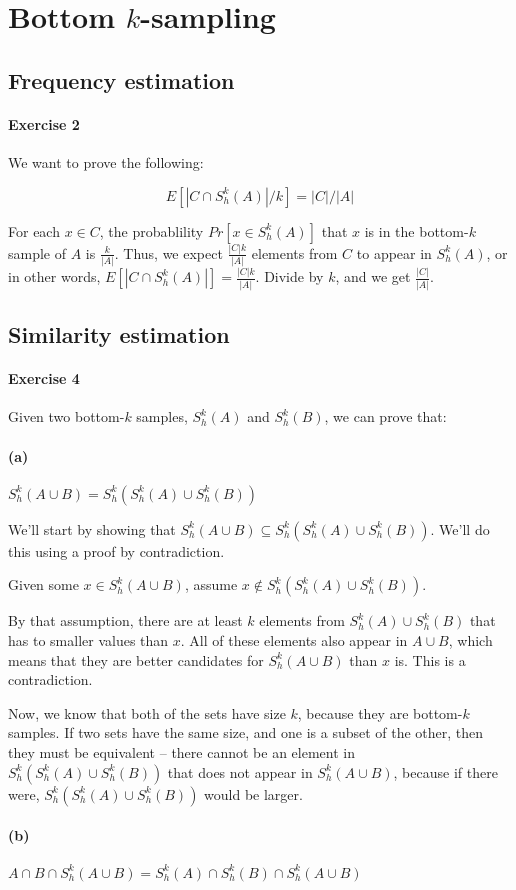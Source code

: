 \section{Bottom $k$-sampling}

\subsection{Frequency estimation}

\paragraph{Exercise 2}
We want to prove the following:

\[
    E[|C \cap S^k_h(A)|/k] = |C|/|A|
\]

For each $x \in C$, the probablility $Pr[x \in S^k_h(A)]$ that $x$ is in the bottom-$k$ sample of $A$ is $\frac{k}{|A|}$. Thus, we expect $\frac{|C|k}{|A|}$ elements from $C$ to appear in $S^k_h(A)$, or in other words, $E[|C \cap S^k_h(A)|] = \frac{|C|k}{|A|}$. Divide by $k$, and we get $\frac{|C|}{|A|}$. 

\subsection{Similarity estimation}

\paragraph{Exercise 4}
Given two bottom-$k$ samples, $S^k_h(A)$ and $S^k_h(B)$, we can prove that:

\paragraph*{(a)}
$S^k_h(A \cup B) = S^k_h(S^k_h(A) \cup S^k_h(B))$

We'll start by showing that $S^k_h(A \cup B) \subseteq S^k_h(S^k_h(A) \cup S^k_h(B))$. We'll do this using a proof by contradiction.

Given some $x \in S^k_h(A \cup B)$, assume $x \notin S^k_h(S^k_h(A) \cup S^k_h(B))$.

By that assumption, there are at least $k$ elements from $S^k_h(A) \cup S^k_h(B)$ that has to smaller values than $x$. All of these elements also appear in $A \cup B$, which means that they are better candidates for $S^k_h(A \cup B)$ than $x$ is. This is a contradiction.

Now, we know that both of the sets have size $k$, because they are bottom-$k$ samples. If two sets have the same size, and one is a subset of the other, then they must be equivalent -- there cannot be an element in $S^k_h(S^k_h(A) \cup S^k_h(B))$ that does not appear in $S^k_h(A \cup B)$, because if there were, $S^k_h(S^k_h(A) \cup S^k_h(B))$ would be larger.

\paragraph*{(b)}
$A \cap B \cap S^k_h(A \cup B) = S^k_h(A) \cap S^k_h(B) \cap S^k_h(A \cup B)$


